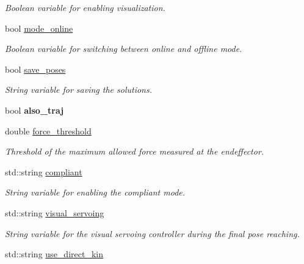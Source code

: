 \begin{DoxyCompactItemize}
\begin{DoxyCompactList}\small\item\em Boolean variable for enabling visualization. \end{DoxyCompactList}\item 
bool \hyperlink{classGraspingModule_afa54033aed276e29223d9a88a6f7f145}{mode\+\_\+online}\label{classGraspingModule_afa54033aed276e29223d9a88a6f7f145}

\begin{DoxyCompactList}\small\item\em Boolean variable for switching between online and offline mode. \end{DoxyCompactList}\item 
bool \hyperlink{classGraspingModule_a8193f9e7fc2e65f52bf80580735113bc}{save\+\_\+poses}\label{classGraspingModule_a8193f9e7fc2e65f52bf80580735113bc}

\begin{DoxyCompactList}\small\item\em String variable for saving the solutions. \end{DoxyCompactList}\item 
bool {\bfseries also\+\_\+traj}\label{classGraspingModule_ada586ca7d90ea75cf6be9847ddb274c7}

\item 
double \hyperlink{classGraspingModule_abd2e8eaca9dd18e74a40fd3831922c16}{force\+\_\+threshold}
\begin{DoxyCompactList}\small\item\em Threshold of the maximum allowed force measured at the endeffector. \end{DoxyCompactList}\item 
std\+::string \hyperlink{classGraspingModule_ad74775f47ff255bde51b0bab79a31728}{compliant}\label{classGraspingModule_ad74775f47ff255bde51b0bab79a31728}

\begin{DoxyCompactList}\small\item\em String variable for enabling the compliant mode. \end{DoxyCompactList}\item 
std\+::string \hyperlink{classGraspingModule_a79082a891f887dbb9edfed4653451e35}{visual\+\_\+servoing}\label{classGraspingModule_a79082a891f887dbb9edfed4653451e35}

\begin{DoxyCompactList}\small\item\em String variable for the visual servoing controller during the final pose reaching. \end{DoxyCompactList}\item 
std\+::string \hyperlink{classGraspingModule_a832c738961170cb80a024805b22464b8}{use\+\_\+direct\+\_\+kin}\label{classGraspingModule_a832c738961170cb80a024805b22464b8}


\end{DoxyCompactItemize}
